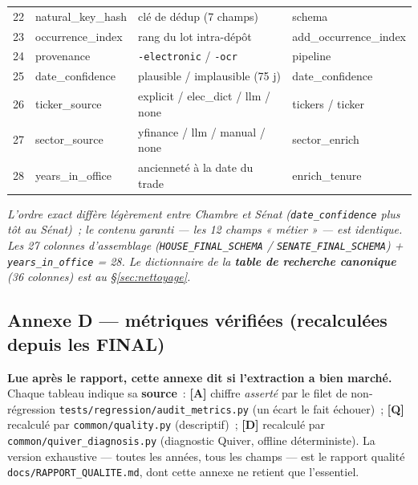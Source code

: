 \documentclass[11pt,a4paper]{article}
\newcommand{\co}[1]{\texttt{\small #1}}
\begin{document}
{\begin{longtable}{r >{\ttfamily}p{3.3cm} p{8.2cm} >{\ttfamily\scriptsize}p{3.0cm}}
22 & natural_key_hash & clé de dédup (7 champs) & schema \\
23 & occurrence_index & rang du lot intra-dépôt & add_occurrence_index \\
24 & provenance & \co{*-electronic} / \co{*-ocr} & pipeline \\
25 & date_confidence & plausible / implausible (75 j) & date_confidence \\
26 & ticker_source & explicit / elec\_dict / llm / none & tickers / ticker \\
27 & sector_source & yfinance / llm / manual / none & sector_enrich \\
28 & years_in_office & ancienneté à la date du trade & enrich_tenure \\
\bottomrule
\end{longtable}}
\textit{L'ordre exact diffère légèrement entre Chambre et Sénat (\co{date_confidence} plus tôt au
Sénat)~; le contenu garanti — les 12 champs « métier » — est identique. Les 27 colonnes d'assemblage
(\co{HOUSE_FINAL_SCHEMA} / \co{SENATE_FINAL_SCHEMA}) + \co{years_in_office} = 28. Le dictionnaire de la
\textbf{table de recherche canonique} (36 colonnes) est au \S{}\ref{sec:nettoyage}.}

\subsection{Annexe D — métriques vérifiées (recalculées depuis les FINAL)}
\label{anx:metrics}
\textbf{Lue après le rapport, cette annexe dit si l'extraction a bien marché.} Chaque tableau indique sa
\textbf{source}~: \textbf{[A]} chiffre \emph{asserté} par le filet de non-régression
\co{tests/regression/audit_metrics.py} (un écart le fait échouer)~; \textbf{[Q]} recalculé par
\co{common/quality.py} (descriptif)~; \textbf{[D]} recalculé par \co{common/quiver_diagnosis.py}
(diagnostic Quiver, offline déterministe). La version exhaustive — toutes les années, tous les champs —
est le rapport qualité \co{docs/RAPPORT_QUALITE.md}, dont cette annexe ne retient que l'essentiel.
\end{document}
